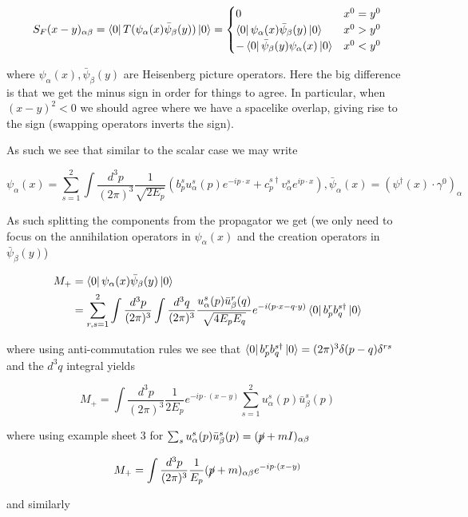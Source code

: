 \documentclass{article}
\theoremstyle{definition}
\begin{document}
$$ S_F(x - y)_{\alpha \beta} = \bra{0} T(\psi_\alpha(x) \bar{\psi}_\beta(y))
\ket{0} =
\begin{cases}
0 & x^0 = y^0 \\
\bra{0} \psi_\alpha(x) \bar{\psi}_\beta(y) \ket{0} & x^0 > y^0 \\
- \bra{0} \bar{\psi}_\beta(y) \psi_\alpha(x) \ket{0} & x^0 < y^0 
\end{cases} $$

where $\psi_\alpha(x), \bar{\psi}_\beta(y)$ are Heisenberg picture operators.
Here the big difference is that we get the minus sign in order for things to
agree. In particular, when $(x - y)^2 < 0$ we should agree where we have a
spacelike overlap, giving rise to the sign (swapping operators inverts the
sign). 

As such we see that similar to the scalar case we may write

$$ \psi_\alpha(x) = \sum_{s = 1}^2 \int \frac{d^3p}{(2\pi)^3} \frac{1}{\sqrt{2
    E_p}} (b^s_p u^s_\alpha(p) e^{-ip \cdot x} + c^{s \dagger}_p v^s_\alpha
e^{ip \cdot x}), \bar{\psi}_\alpha(x) = (\psi^\dagger(x) \cdot
\gamma^0)_\alpha $$

As such splitting the components from the propagator we get (we only need to
focus on the annihilation operators in $\psi_\alpha(x)$ and the creation
operators in $\bar{\psi}_\beta(y)$)

\begin{align*}
M_+ &= \bra{0} \psi_\alpha(x) \bar{\psi}_\beta(y) \ket{0} \\
&= \sum_{r,s = 1}^2 \int \frac{d^3p}{(2\pi)^3} \int \frac{d^3q}{(2\pi)^3}
   \frac{u_\alpha^s(p) \bar{u}_\beta^r(q)}{\sqrt{4 E_p E_q}} e^{-i(p \cdot x - q \cdot y)} 
   \bra{0} b_p^r b_q^{s \dagger} \ket{0}
\end{align*}

where using anti-commutation rules we see that $\bra{0} b_p^r b_q^{s \dagger}
\ket{0} = (2\pi)^3 \delta(p - q) \delta^{rs}$ and the $d^3q$ integral yields

$$ M_+ = \int \frac{d^3p}{(2\pi)^3} \frac{1}{2E_p} e^{-ip \cdot (x - y)} \sum_{s
= 1}^2 u^s_\alpha(p) \bar{u}^s_\beta (p) $$

where using example sheet 3 for $\sum_s u^s_\alpha(p) \bar{u}_\beta^s(p) =
(\cancel{p} + mI)_{\alpha \beta}$ 

$$ M_+ = \int \frac{d^3p}{(2\pi)^3} \frac{1}{E_p} (\cancel{p} + m)_{\alpha
  \beta} e^{-ip \cdot (x - y)} $$

and similarly
\end{document}
